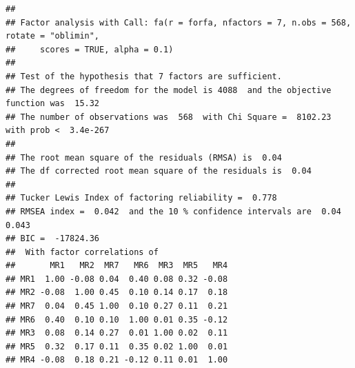 \documentclass[
  english,
  man]{apa6}
\begin{document}
\begin{verbatim}
## 
## Factor analysis with Call: fa(r = forfa, nfactors = 7, n.obs = 568, rotate = "oblimin", 
##     scores = TRUE, alpha = 0.1)
## 
## Test of the hypothesis that 7 factors are sufficient.
## The degrees of freedom for the model is 4088  and the objective function was  15.32 
## The number of observations was  568  with Chi Square =  8102.23  with prob <  3.4e-267 
## 
## The root mean square of the residuals (RMSA) is  0.04 
## The df corrected root mean square of the residuals is  0.04 
## 
## Tucker Lewis Index of factoring reliability =  0.778
## RMSEA index =  0.042  and the 10 % confidence intervals are  0.04 0.043
## BIC =  -17824.36
##  With factor correlations of 
##       MR1   MR2  MR7   MR6  MR3  MR5   MR4
## MR1  1.00 -0.08 0.04  0.40 0.08 0.32 -0.08
## MR2 -0.08  1.00 0.45  0.10 0.14 0.17  0.18
## MR7  0.04  0.45 1.00  0.10 0.27 0.11  0.21
## MR6  0.40  0.10 0.10  1.00 0.01 0.35 -0.12
## MR3  0.08  0.14 0.27  0.01 1.00 0.02  0.11
## MR5  0.32  0.17 0.11  0.35 0.02 1.00  0.01
## MR4 -0.08  0.18 0.21 -0.12 0.11 0.01  1.00
\end{verbatim}
\end{document}
